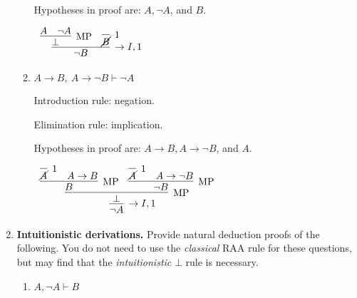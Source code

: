 \documentclass[11pt]{report}
\begin{document}
\begin{enumerate}
\begin{enumerate}
		Hypotheses in proof are: $A, \lnot A$, and $B$.

		\begin{mdframed}
			\begin{center}
				$\begin{array}{c}
					\infer[\to I,1]{\lnot B}
						{\infer[\MP]{\bot}{A & \lnot A}
						&
						\infer[1]{\cancel{B}}{}}
				\end{array}$
			\end{center}
		\end{mdframed}
		
		\item $A\to B, \ A \to \lnot B \vdash \lnot A$
				
		\hspace{0.2cm}{\bf Solution}

		Introduction rule: negation.
			
		\vspace{0.2cm}
			
		Elimination rule: implication.
		
		\vspace{0.2cm}

		Hypotheses in proof are: $A \to B, A \to \lnot B$, and $A$. 

		\begin{mdframed}
			\begin{center}
				$\begin{array}{c}
					\infer[\to I,1]{\lnot A}
						{\infer[\MP]{\bot}
							{\infer[\MP]{B}
								{\infer[1]{\cancel{A}}{}
								&
								A \to B}
							&
							\infer[\MP]{\lnot B}
								{\infer[1]{\cancel{A}}{}
								&
								A \to \lnot B}}}
				\end{array}$
			\end{center}
		\end{mdframed}
		
	\end{enumerate}	

	\newpage
	\item \textbf{Intuitionistic derivations.} Provide natural deduction proofs of the following. You do not need to use the \emph{classical} RAA rule for these questions, but may find that the \emph{intuitionistic} $\bot$ rule is necessary.
	 
	\begin{enumerate}

		\item $A, \neg A \vdash  B$ 
	   
		\hspace{0.2cm}{\bf Solution}
 

\end{enumerate}
\end{enumerate}
\end{document}
